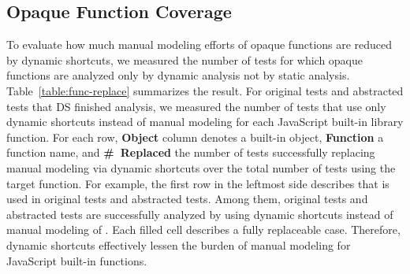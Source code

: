 \subsection{Opaque Function Coverage}
To evaluate how much manual modeling efforts of opaque functions
are reduced by dynamic shortcuts, we measured the number of tests for which
opaque functions are analyzed only by dynamic analysis not by
static analysis.  Table~\ref{table:func-replace} summarizes the result.
For  original tests and  abstracted tests that DS finished analysis, we measured the
number of tests that use only dynamic shortcuts instead of manual modeling
for each JavaScript built-in library function.  For each row,
\textbf{Object} column denotes a built-in object, \textbf{Function} a function
name, and \textbf{\#~Replaced} the number of tests successfully replacing manual
modeling via dynamic shortcuts over the total number of tests using the target function.
For example, the first row in the leftmost side describes that  is used in
 original tests and  abstracted tests.  Among them,  original
tests and  abstracted tests are successfully analyzed by using dynamic shortcuts
instead of manual modeling of .  Each filled cell describes
a fully replaceable case.  Therefore, dynamic
shortcuts effectively lessen the burden of manual modeling for JavaScript
built-in functions.  
